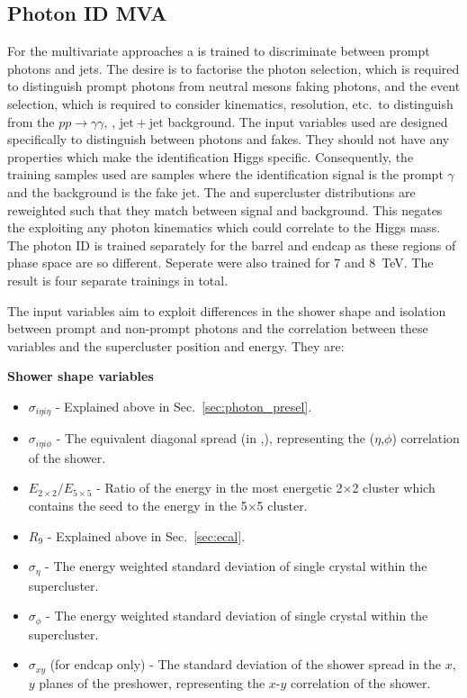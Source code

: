 \subsection{Photon ID MVA}
\label{sec:pho_id_mva}

For the multivariate approaches a \BDT is trained to discriminate between prompt photons and jets. The desire is to factorise the photon selection, which is required to distinguish prompt photons from neutral mesons faking photons, and the event selection, which is required to consider kinematics, resolution, etc.~to distinguish \Hgg from the $pp\rightarrow\gamma\gamma$, \gjet, $\mathrm{jet}+\mathrm{jet}$ background. The input variables used are designed specifically to distinguish between photons and fakes. They should not have any properties which make the identification Higgs specific. Consequently, the training samples used are \gjet samples where the identification \BDT signal is the prompt $\gamma$ and the background is the fake jet. The \pT and supercluster \eta distributions are reweighted such that they match between signal and background. This negates the \BDT exploiting any photon kinematics which could correlate to the Higgs mass. The photon ID \BDT is trained separately for the barrel and endcap as these regions of phase space are so different. Seperate \BDTs were also trained for 7 and 8~TeV. The result is four separate trainings in total.

The input variables aim to exploit differences in the shower shape and isolation between prompt and non-prompt photons and the correlation between these variables and the supercluster position and energy. They are:

\noindent\textbf{Shower shape variables}
\begin{itemize}
  \item $\sigma_{i\eta i\eta}$ - Explained above in Sec.~\ref{sec:photon_presel}.
  \item $\sigma_{i\eta i\phi}$ - The equivalent diagonal spread (in \eta,\phi), representing the ($\eta$,$\phi$) correlation of the shower.
  \item $E_{2\times2}/E_{5\times5}$ - Ratio of the energy in the most energetic 2$\times$2 cluster which contains the seed to the energy in the 5$\times$5 cluster.
  \item $R_{9}$ - Explained above in Sec.~\ref{sec:ecal}.
  \item $\sigma_{\eta}$ - The energy weighted standard deviation of single crystal \eta within the supercluster.
  \item $\sigma_{\phi}$ - The energy weighted standard deviation of single crystal \phi within the supercluster.
  \item $\sigma_{xy}$ (for endcap only) - The standard deviation of the shower spread in the $x$, $y$ planes of the preshower, representing the $x$-$y$ correlation of the shower.
\end{itemize}

